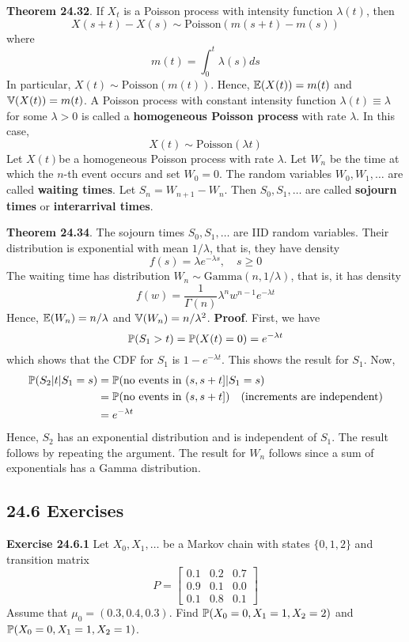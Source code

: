 \textbf{Theorem 24.32}. If \(X_t\) is a Poisson process with intensity
function \(\lambda(t)\), then
\[
X(s + t) - X(s) \sim \text{Poisson}\left( m(s + t) - m(s) \right)
\]
where
\[
m(t) = \int_{0}^t \lambda(s) ds
\]
In particular, \(X(t) \sim \text{Poisson}(m(t))\). Hence,
\(\operatorname{\mathbb{E}}(X(t)) = m(t)\) and \(\operatorname{\mathbb{V}}(X(t)) = m(t)\).
A Poisson process with constant intensity function
\(\lambda(t) \equiv \lambda\) for some \(\lambda > 0\) is called a
\textbf{homogeneous Poisson process} with rate \(\lambda\). In this
case,
\[
X(t) \sim \text{Poisson}(\lambda t)
\]
Let \(X(t)\)be a homogeneous Poisson process with rate \(\lambda\). Let
\(W_{n}\) be the time at which the \(n\)-th event occurs and set
\(W_{0} = 0\). The random variables \(W_{0}, W_{1}, \dots\) are called
\textbf{waiting times}. Let \(S_{n} = W_{n + 1} - W_{n}\). Then
\(S_{0}, S_{1}, \dots\) are called \textbf{sojourn times} or
\textbf{interarrival times}.

\textbf{Theorem 24.34}. The sojourn times \(S_{0}, S_{1}, \dots\) are IID
random variables. Their distribution is exponential with mean
\(1 / \lambda\), that is, they have density
\[
f(s) = \lambda e^{-\lambda s}, \quad s \geq 0
\]
The waiting time has distribution
\(W_{n} \sim \text{Gamma}(n, 1 / \lambda)\), that is, it has density
\[
f(w) = \frac{1}{\Gamma(n)} \lambda^{n} w^{n - 1}e^{-\lambda t}
\]
Hence, \(\operatorname{\mathbb{E}}(W_{n}) = n / \lambda\) and
\(\operatorname{\mathbb{V}}(W_{n}) = n / \lambda^{2}\).
\textbf{Proof}. First, we have
\[
\operatorname{\mathbb{P}}(S_{1} > t) = \operatorname{\mathbb{P}}(X(t) = 0) = e^{-\lambda t}
\]
which shows that the CDF for \(S_{1}\) is \(1 - e^{-\lambda t}\). This
shows the result for \(S_{1}\). Now,
\begin{align*}
\PROB(S_{2} | t | S_{1} = s) &= \PROB\left(\text{no events in } (s, s+t] | S_{1} = s\right) \\
&= \PROB\left(\text{no events in } (s, s+t]\right) \quad \text{(increments are independent)} \\
&= e^{-\lambda t}
\end{align*}
Hence, \(S_{2}\) has an exponential distribution and is independent of
\(S_{1}\). The result follows by repeating the argument. The result for
\(W_{n}\) follows since a sum of exponentials has a Gamma distribution.

\subsection*{24.6 Exercises}

\textbf{Exercise 24.6.1} Let \(X_{0}, X_{1}, \dots\) be a Markov chain with
states \(\{ 0, 1, 2 \}\) and transition matrix
\[
P = \begin{bmatrix}
0.1 & 0.2 & 0.7 \\
0.9 & 0.1 & 0.0 \\
0.1 & 0.8 & 0.1
\end{bmatrix}
\]
Assume that \(\mu_{0} = (0.3, 0.4, 0.3)\). Find
\(\operatorname{\mathbb{P}}(X_{0} = 0, X_{1} = 1, X_{2} = 2)\) and
\(\operatorname{\mathbb{P}}(X_{0} = 0, X_{1} = 1, X_{2} = 1)\).

